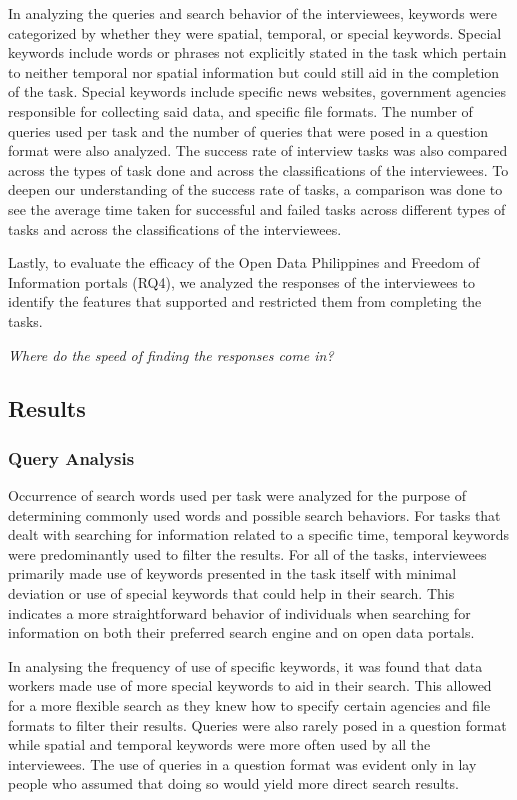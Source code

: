\documentclass{sigchi}
\begin{document}
In analyzing the queries and search behavior of the interviewees, keywords were categorized by whether they were spatial, temporal, or special keywords. Special keywords include words or phrases not explicitly stated in the task which pertain to neither temporal nor spatial information but could still aid in the completion of the task. Special keywords include specific news websites, government agencies responsible for collecting said data, and specific file formats. The number of queries used per task and the number of queries that were posed in a question format were also analyzed. The success rate of interview tasks was also compared across the types of task done and across the classifications of the interviewees. To deepen our understanding of the success rate of tasks, a comparison was done to see the average time taken for successful and failed tasks across different types of tasks and across the classifications of the interviewees.

Lastly, to evaluate the efficacy of the Open Data Philippines and Freedom of Information portals (RQ4), we analyzed the responses of the interviewees to identify the features that supported and restricted them from completing the tasks. 


\textit{Where do the speed of finding the responses come in?}

\subsection{Results}


\subsubsection{Query Analysis}
Occurrence of search words used per task were analyzed for the purpose of determining commonly used words and possible search behaviors. For tasks that dealt with searching for information related to a specific time, temporal keywords were predominantly used to filter the results. For all of the tasks, interviewees primarily made use of keywords presented in the task itself with minimal deviation or use of special keywords that could help in their search. This indicates a more straightforward behavior of individuals when searching for information on both their preferred search engine and on open data portals.

In analysing the frequency of use of specific keywords, it was found that data workers made use of more special keywords to aid in their search. This allowed for a more flexible search as they knew how to specify certain agencies and file formats to filter their results. Queries were also rarely posed in a question format while spatial and temporal keywords were more often used by all the interviewees. The use of queries in a question format was evident only in lay people who assumed that doing so would yield more direct search results.
\end{document}
